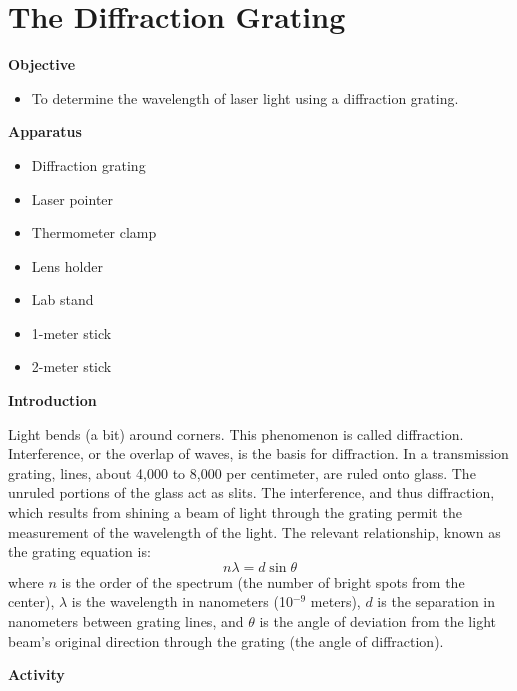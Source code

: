 
\section{The Diffraction Grating}

\makelabheader %

\bigskip
\textbf{Objective}

\begin{itemize}
\vspace{-0.12in}  %
\item To determine the wavelength of laser light using a diffraction grating.
\end{itemize}

\textbf{Apparatus}
\begin{itemize}
\item Diffraction grating 
\item Laser pointer
\item Thermometer clamp
\item Lens holder
\item Lab stand
\item 1-meter stick 
\item 2-meter stick
\end{itemize}

\textbf{Introduction}

Light bends (a bit) around corners. This phenomenon is called diffraction.
Interference, or the overlap of waves, is the basis for diffraction.
In a transmission grating, lines, about 4,000 to 8,000 per centimeter,
are ruled onto glass. The unruled portions of the glass act as slits.
The interference, and thus diffraction, which results from shining
a beam of light through the grating permit the measurement of the
wavelength of the light. The relevant relationship, known as the grating
equation is:
\begin{displaymath} n\lambda = d \sin \theta \end{displaymath}
where $n$ is the order of the spectrum (the number of bright spots
from the center), $\lambda$ is the wavelength in nanometers (10\( ^{-9} \)
meters), $d$ is the separation in nanometers between grating lines,
and $\theta$ is the angle of deviation from the light beam's original
direction through the grating (the angle of diffraction).

\bigskip
\textbf{Activity}

